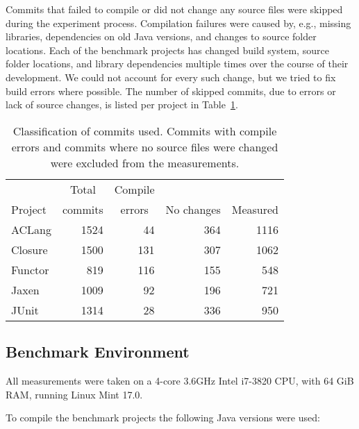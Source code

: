 {Commits that failed to compile or did not change any source files were skipped during the experiment
process.  Compilation failures were caused by, e.g., missing libraries, dependencies on old Java
versions, and changes to source folder locations.  Each of the benchmark projects has changed build
system, source folder locations, and library dependencies multiple times over the course of their
development.  We could not account for every such change, but we tried to fix build errors
where possible.  The number of skipped commits, due to errors or lack of source changes, is listed
per project in Table~\ref{tbl:commits}.

\begin{table}[h]
  \centering
\begin{tabular}{l|r|r|r|r}
   &\multicolumn{1}{c|}{Total} & \multicolumn{1}{c|}{Compile} &  &  \\
  Project & \multicolumn{1}{c|}{commits} & \multicolumn{1}{c|}{errors} & No changes & Measured \\
  \hline
  ACLang & 1524 &    44 &  364 &    1116 \\
 Closure & 1500 &   131 &  307 &    1062 \\
 Functor &  819 &   116 &  155 &     548 \\
   Jaxen & 1009 &    92 &  196 &     721 \\
   JUnit & 1314 &    28 &  336 &     950 \\
  \hline
\end{tabular}
\caption{Classification of commits used. Commits with compile errors and commits where
no source files were changed were excluded from the measurements.}
\label{tbl:commits}
\end{table}


\newpage
\subsection{Benchmark Environment}

All measurements were taken on a 4-core 3.6GHz Intel i7-3820 CPU, with 64 GiB
RAM, running Linux Mint 17.0.

To compile the benchmark projects the following Java versions were used:

}

